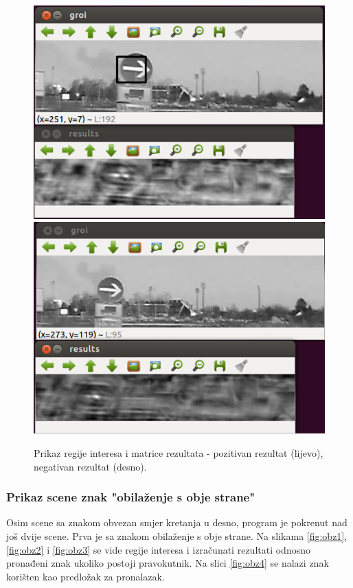 \begin{figure}[!htb]
    \includegraphics[width=\linewidth]{figures/06.png}
\endminipage\hfill
{}
    \includegraphics[width=\linewidth]{figures/07.png}
\endminipage\hfill
\caption{Prikaz regije interesa i matrice rezultata - pozitivan rezultat
(lijevo), negativan rezultat (desno).}
\label{fig:06.png}
\end{figure}

\newpage
\subsubsection*{Prikaz scene znak "obilaženje s obje strane"}

Osim scene sa znakom obvezan smjer kretanja u desno, program je pokrenut
nad još dvije scene. Prva je sa znakom obilaženje s obje strane. Na slikama 
\ref{fig:obz1}, \ref{fig:obz2} i \ref{fig:obz3} se vide regije interesa i 
izračunati rezultati odnosno pronađeni znak ukoliko postoji pravokutnik. Na
slici \ref{fig:obz4} se nalazi znak korišten kao predložak za pronalazak.

